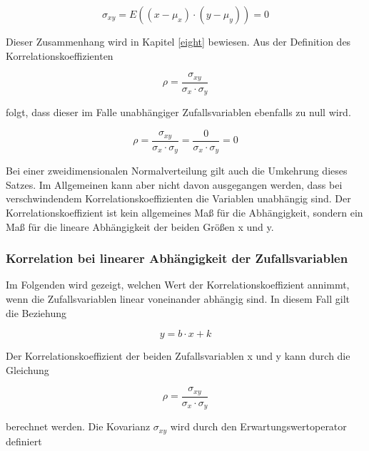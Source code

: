 \begin{equation}\label{eq:tenthirtyone}
\sigma _{xy} =E\left((x-\mu _{x})\cdot (y-\mu _{y})\right)=0
\end{equation}

\noindent Dieser Zusammenhang wird in Kapitel \ref{eight} bewiesen. Aus der Definition des Korrelationskoeffizienten

\begin{equation}\label{eq:tenthirtytwo}
\rho =\dfrac{\sigma _{xy}}{\sigma _{x} \cdot \sigma _{y}}
\end{equation}

\noindent folgt, dass dieser im Falle unabh\"{a}ngiger Zufallsvariablen ebenfalls zu null wird.

\begin{equation}\label{eq:tenthirtythree}
\rho =\dfrac{\sigma _{xy}}{\sigma _{x} \cdot \sigma _{y}} =\dfrac{0}{\sigma _{x} \cdot \sigma _{y}} =0
\end{equation}

\noindent Bei einer zweidimensionalen Normalverteilung gilt auch die Umkehrung dieses Satzes. Im Allgemeinen kann aber nicht davon ausgegangen werden, dass bei verschwindendem Korrelationskoeffizienten die Variablen unabh\"{a}ngig sind. Der Korrelationskoeffizient ist kein allgemeines Ma{\ss} f\"{u}r die Abh\"{a}ngigkeit, sondern ein Ma{\ss} f\"{u}r die lineare Abh\"{a}ngigkeit der beiden Gr\"{o}{\ss}en x und y. 

\subsubsection{Korrelation bei linearer Abh\"{a}ngigkeit der Zufallsvariablen}

\noindent Im Folgenden wird gezeigt, welchen Wert der Korrelationskoeffizient annimmt, wenn die Zufallsvariablen linear voneinander abh\"{a}ngig sind. In diesem Fall gilt die Beziehung

\begin{equation}\label{eq:tenthirtyfour}
y=b\cdot x+k
\end{equation}

\noindent Der Korrelationskoeffizient der beiden Zufallsvariablen x und y kann durch die Gleichung

\begin{equation}\label{eq:tenthirtyfive}
\rho =\dfrac{\sigma _{xy}}{\sigma _{x} \cdot \sigma _{y}}
\end{equation}

\noindent berechnet werden. Die Kovarianz $\sigma_{xy}$ wird durch den Erwartungswertoperator definiert 

